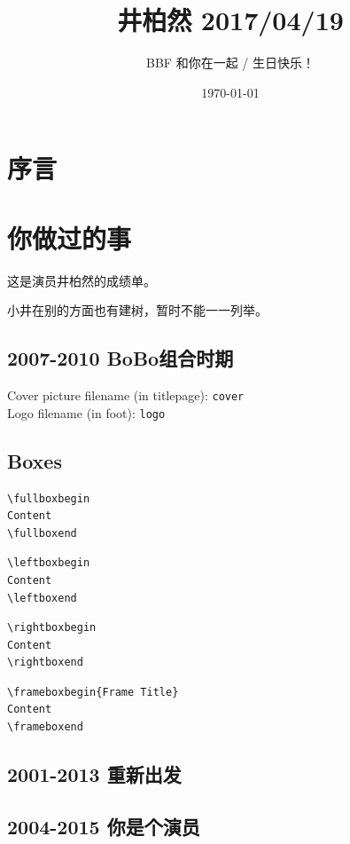 \documentclass[12pt]{ctexart}
\title{井柏然 2017/04/19}
\author{BBF \newline 和你在一起 / 生日快乐！}
\date{\today}
\begin{document}
\maketitle

\tableofcontents
\clearpage

\section{序言}
\newpage

\section{你做过的事}

这是演员井柏然的成绩单。

小井在别的方面也有建树，暂时不能一一列举。

\subsection{2007-2010 BoBo组合时期}

\noindent
Cover picture filename (in titlepage): \texttt{cover}\\
Logo filename (in foot): \texttt{logo}

\subsection{Boxes}

\begin{verbatim}
\fullboxbegin
Content
\fullboxend
\end{verbatim}

\begin{verbatim}
\leftboxbegin
Content
\leftboxend
\end{verbatim}

\begin{verbatim}
\rightboxbegin
Content
\rightboxend
\end{verbatim}

\begin{verbatim}
\frameboxbegin{Frame Title}
Content
\frameboxend
\end{verbatim}

\subsection{2001-2013 重新出发}


\subsection{2004-2015 你是个演员}
\end{document}
